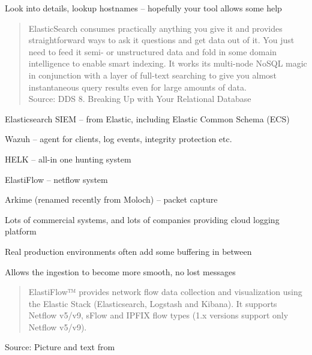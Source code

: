 \documentclass[Screen16to9,17pt]{foils}
\begin{document}
Look into details, lookup hostnames -- hopefully your tool allows some help





\begin{quote}\small
ElasticSearch consumes practically anything you give it and provides straightforward ways to ask it questions and get data out of it. You just need to feed it semi- or unstructured data and fold in some domain intelligence to enable smart indexing. It works its multi-node NoSQL magic in conjunction with a layer of full-text searching to give you almost instantaneous query results even for large amounts of data.\\
Source: DDS 8. Breaking Up with Your Relational Database
\end{quote}

\begin{list2}
\item Elasticsearch SIEM -- from Elastic, including Elastic Common Schema (ECS)\\
\item Wazuh -- agent for clients, log events, integrity protection etc.
\item HELK -- all-in one hunting system
\item ElastiFlow -- netflow system
\item Arkime (renamed recently from Moloch) -- packet capture
\end{list2}

Lots of commercial systems, and lots of companies providing cloud logging platform


\begin{list2}
\item Real production environments often add some buffering in between
\item Allows the ingestion to become more smooth, no lost messages
\end{list2}




\begin{quote}
  ElastiFlow™ provides network flow data collection and visualization using the Elastic Stack (Elasticsearch, Logstash and Kibana). It supports Netflow v5/v9, sFlow and IPFIX flow types (1.x versions support only Netflow v5/v9).
\end{quote}
Source: Picture and text from 
\end{document}
